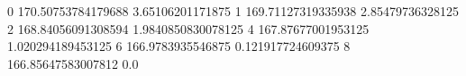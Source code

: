 0 170.50753784179688 3.65106201171875
1 169.71127319335938 2.85479736328125
2 168.84056091308594 1.9840850830078125
4 167.87677001953125 1.020294189453125
6 166.9783935546875 0.121917724609375
8 166.85647583007812 0.0
